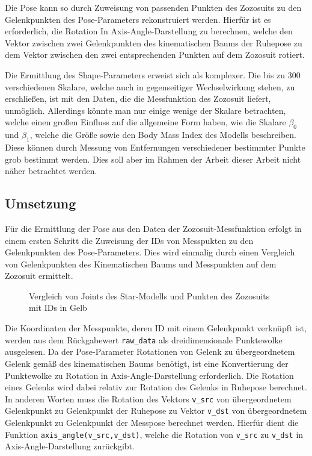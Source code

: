 Die Pose kann so durch Zuweisung von passenden Punkten des Zozosuits zu den Gelenkpunkten des
Pose-Parameters rekonstruiert werden. Hierfür ist es erforderlich, die Rotation In
Axis-Angle-Darstellung zu berechnen, welche den Vektor zwischen zwei Gelenkpunkten des kinematischen Baums der Ruhepose zu dem 
Vektor zwischen den zwei entsprechenden Punkten auf dem Zozosuit rotiert.

Die Ermittlung des Shape-Parameters erweist sich als komplexer. Die bis zu 300 verschiedenen Skalare, welche auch in
gegenseitiger Wechselwirkung stehen, zu erschließen, ist mit den Daten, die die Messfunktion des Zozosuit liefert,
unmöglich. Allerdings könnte man nur einige wenige der Skalare betrachten, welche einen großen Einfluss auf die
allgemeine Form haben, wie die Skalare $\beta _0$ und $\beta _1$, welche die Größe sowie den Body Mass Index des Modells beschreiben. Diese können 
durch Messung von Entfernungen verschiedener bestimmter Punkte grob bestimmt werden. Dies soll aber im Rahmen
der Arbeit dieser Arbeit nicht näher betrachtet werden.

\subsection{Umsetzung}
Für die Ermittlung der Pose aus den Daten der Zozosuit-Messfunktion erfolgt in 
einem ersten Schritt die Zuweisung der IDs von Messpukten zu den Gelenkpunkten des Pose-Parameters.
 Dies wird einmalig durch einen Vergleich von Gelenkpunkten des Kinematischen Baums und 
Messpunkten auf dem Zozosuit ermittelt.

\begin{figure}[H]
  \centering 
   \qquad 
  \caption{Vergleich von Joints des Star-Modells und Punkten des Zozosuits mit IDs in Gelb} 
  \label{fig:pointpos}
\end{figure}

Die Koordinaten der Messpunkte, deren ID mit einem Gelenkpunkt verknüpft ist, werden aus dem Rückgabewert
\texttt{raw\_data} als dreidimensionale Punktewolke ausgelesen. Da der Pose-Parameter Rotationen von Gelenk zu 
übergeordnetem Gelenk gemäß des kinematischen Baums benötigt, ist eine Konvertierung der Punktewolke zu Rotation in 
Axis-Angle-Darstellung erforderlich. Die Rotation eines Gelenks wird dabei relativ zur Rotation des Gelenks in Ruhepose berechnet.
In anderen Worten muss die Rotation des Vektors \texttt{v\_src} von übergeordnetem Gelenkpunkt zu Gelenkpunkt
der Ruhepose zu Vektor \texttt{v\_dst} von übergeordnetem Gelenkpunkt zu Gelenkpunkt der Messpose berechnet werden. Hierfür dient die
Funktion \texttt{axis\_angle(v\_src,v\_dst)}, welche die Rotation von \texttt{v\_src} zu \texttt{v\_dst} in Axis-Angle-Darstellung zurückgibt.

